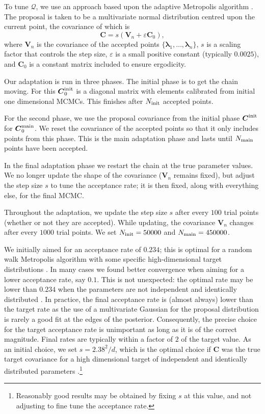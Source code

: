To tune $\mathcal{Q}$, we use an approach based upon the adaptive Metropolis algorithm \citep{Haario2001}. The proposal is taken to be a multivariate normal distribution centred upon the current point, the covariance of which is
\begin{equation}
\boldsymbol{C} = s \left(\boldsymbol{V}_n + \varepsilon\boldsymbol{C}_0\right),
\end{equation}
where $\boldsymbol{V}_n$ is the covariance of the accepted points $\{\boldsymbol{\lambda}_1,\ldots,\boldsymbol{\lambda}_n\}$, $s$ is a scaling factor that controls the step size, $\varepsilon$ is a small positive constant (typically $0.0025$), and $\boldsymbol{C}_0$ is a constant matrix included to ensure ergodicity.

Our adaptation is run in three phases. The initial phase is to get the chain moving. For this $\boldsymbol{C}_0^\mathrm{init}$ is a diagonal matrix with elements calibrated from initial one dimensional MCMCs. This finishes after $N_\mathrm{init}$ accepted points.

For the second phase, we use the proposal covariance from the initial phase $\boldsymbol{C}^\mathrm{init}$ for $\boldsymbol{C}_0^\mathrm{main}$. We reset the covariance of the accepted points so that it only includes points from this phase. This is the main adaptation phase and lasts until $N_\mathrm{main}$ points have been accepted.

In the final adaptation phase we restart the chain at the true parameter values. We no longer update the shape of the covariance ($\boldsymbol{V}_n$ remains fixed), but adjust the step size $s$ to tune the acceptance rate; it is then fixed, along with everything else, for the final MCMC.

Throughout the adaptation, we update the step size $s$ after every $100$ trial points (whether or not they are accepted). While updating, the covariance $\boldsymbol{V}_n$ changes after every $1000$ trial points. We set $N_\mathrm{init} = 50000$ and $N_\mathrm{main} = 450000$.

We initially aimed for an acceptance rate of $0.234$; this is optimal for a random walk Metropolis algorithm with some specific high-dimensional target distributions \citep{Roberts1997,Roberts2001}. In many cases we found better convergence when aiming for a lower acceptance rate, say $0.1$. This is not unexpected: the optimal rate may be lower than $0.234$ when the parameters are not independent and identically distributed \citep{Bedard2007, Bedard2008, Bedard2008a}. In practice, the final acceptance rate is (almost always) lower than the target rate as the use of a multivariate Gaussian for the proposal distribution is rarely a good fit at the edges of the posterior. Consequently, the precise choice for the target acceptance rate is unimportant as long as it is of the correct magnitude. Final rates are typically within a factor of $2$ of the target value. As an initial choice, we set $s = 2.38^2/d$, which is the optimal choice if $\boldsymbol{C}$ was the true target covariance for a high dimensional target of independent and identically distributed parameters \citep{Gelman1996,Roberts1997,Roberts2001,Haario2001}.\footnote{Reasonably good results may be obtained by fixing $s$ at this value, and not adjusting to fine tune the acceptance rate.}

